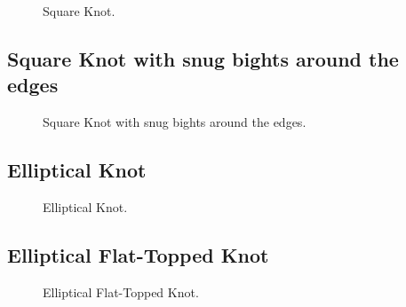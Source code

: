 \begin{figure}[H]\centering
	\begin{minipage}{1\linewidth}
		\begin{center}
			\tcbox[enhanced jigsaw,colframe=black,opacityframe=0.5,opacityback=0.5]
			{\centering{}}
		\end{center}
	\end{minipage}
\caption{Square Knot.}
\label{ris:Square_Knot}
\end{figure}

\subsection{Square Knot with snug bights around the edges}

\begin{figure}[H]\centering
	\begin{minipage}{1\linewidth}
		\begin{center}
			\tcbox[enhanced jigsaw,colframe=black,opacityframe=0.5,opacityback=0.5]
			{\centering{}}
		\end{center}
	\end{minipage}
\caption{Square Knot with snug bights around the edges.}
\label{ris:Square_Knot_with_snug}
\end{figure}

\subsection{Elliptical Knot}

\begin{figure}[H]\centering
	\begin{minipage}{1\linewidth}
		\begin{center}
			\tcbox[enhanced jigsaw,colframe=black,opacityframe=0.5,opacityback=0.5]
			{\centering{}}
		\end{center}
	\end{minipage}
\caption{Elliptical Knot.}
\label{ris:Elliptical_Knot}
\end{figure}

\subsection{Elliptical Flat-Topped Knot}

\begin{figure}[H]\centering
	\begin{minipage}{1\linewidth}
		\begin{center}
			\tcbox[enhanced jigsaw,colframe=black,opacityframe=0.5,opacityback=0.5]
			{\centering{}}
		\end{center}
	\end{minipage}
\caption{Elliptical Flat-Topped Knot.}
\label{ris:Elliptical_Flat-Topped_Knot}
\end{figure}

